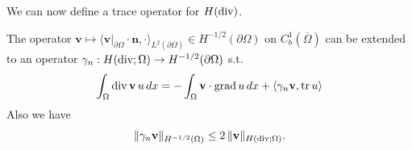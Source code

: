 \documentclass[../master_thesis.tex]{subfiles}
\begin{document}
We can now define a trace operator for $H(\operatorname{div})$.
\begin{theorem}\label{thm:trace_of_hdiv}
    The operator $\mathbf{v} \mapsto \langle \mathbf{v}|_{\partial \Omega} \cdot \mathbf{n}, \cdot
    \rangle_{L^2(\partial \Omega)} \in H^{-1/2}(\partial\Omega)$
    on $C^1_b(\overline{\Omega})$ can be extended to an operator 
    $\gamma_n: H(\operatorname{div};\Omega) \rightarrow H^{-1/2}(\partial \Omega)$ s.t.
    \begin{align*}
        \int_\Omega \operatorname{div} \mathbf{v} \,u \, dx 
        = -\int_\Omega \mathbf{v} \cdot \operatorname{grad} u \, dx + \langle \gamma_n \mathbf{v}, \operatorname{tr} u \rangle
    \end{align*}
    Also we have
    \begin{align*}
        \lVert \gamma_n \mathbf{v} \rVert _{H^{-1/2}(\Omega)} 
        \leq   2 \,  \lVert \mathbf{v}\rVert _{H(\operatorname{div}; \Omega)}.
    \end{align*}
\end{theorem}
\end{document}

